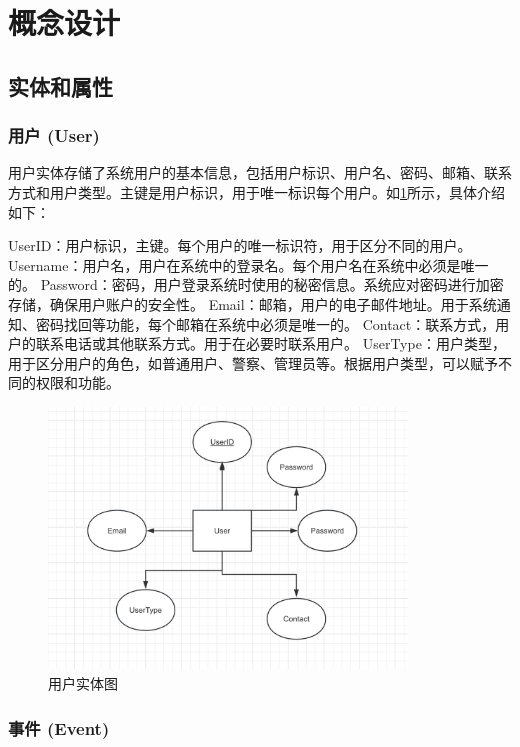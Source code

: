\section{概念设计}

\subsection{实体和属性}

\subsubsection{用户 (User)}

用户实体存储了系统用户的基本信息，包括用户标识、用户名、密码、邮箱、联系方式和用户类型。主键是用户标识，用于唯一标识每个用户。如\cref{fig:entity-user}所示，具体介绍如下：

UserID：用户标识，主键。每个用户的唯一标识符，用于区分不同的用户。
Username：用户名，用户在系统中的登录名。每个用户名在系统中必须是唯一的。
Password：密码，用户登录系统时使用的秘密信息。系统应对密码进行加密存储，确保用户账户的安全性。
Email：邮箱，用户的电子邮件地址。用于系统通知、密码找回等功能，每个邮箱在系统中必须是唯一的。
Contact：联系方式，用户的联系电话或其他联系方式。用于在必要时联系用户。
UserType：用户类型，用于区分用户的角色，如普通用户、警察、管理员等。根据用户类型，可以赋予不同的权限和功能。

\begin{figure}[h!]
    \centering
    \includegraphics[width=0.85\textwidth]{figures/db-img-01.png}
    \caption{用户实体图}
    \label{fig:entity-user}
\end{figure}

\subsubsection{事件 (Event)}

